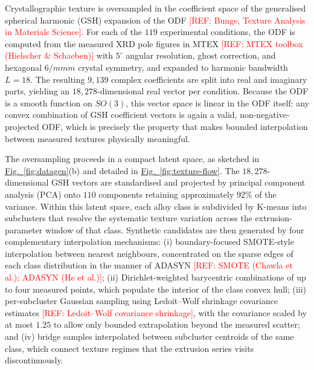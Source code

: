 \documentclass[preprint,12pt]{elsarticle}
\newcommand{\figref}[1]{\hyperref[#1]{Fig.~\ref*{#1}}}
\newcommand{\refneeded}[1]{\textcolor{red}{[REF: #1]}} %
\begin{document}
Crystallographic texture is oversampled in the coefficient space of the generalised spherical harmonic (GSH) expansion of the ODF \refneeded{Bunge, Texture Analysis in Materials Science}. For each of the $119$ experimental conditions, the ODF is computed from the measured XRD pole figures in MTEX \refneeded{MTEX toolbox (Hielscher \& Schaeben)} with $5^{\circ}$ angular resolution, ghost correction, and hexagonal $6/mmm$ crystal symmetry, and expanded to harmonic bandwidth $L = 18$. The resulting $9{,}139$ complex coefficients are split into real and imaginary parts, yielding an $18{,}278$-dimensional real vector per condition. Because the ODF is a smooth function on $SO(3)$, this vector space is linear in the ODF itself: any convex combination of GSH coefficient vectors is again a valid, non-negative-projected ODF, which is precisely the property that makes bounded interpolation between measured textures physically meaningful.

The oversampling proceeds in a compact latent space, as sketched in \figref{fig:datagen}(b) and detailed in \figref{fig:texture-flow}. The $18{,}278$-dimensional GSH vectors are standardised and projected by principal component analysis (PCA) onto $110$ components retaining approximately $92\%$ of the variance. Within this latent space, each alloy class is subdivided by K-means into subclusters that resolve the systematic texture variation across the extrusion-parameter window of that class. Synthetic candidates are then generated by four complementary interpolation mechanisms: (i) boundary-focused SMOTE-style interpolation between nearest neighbours, concentrated on the sparse edges of each class distribution in the manner of ADASYN \refneeded{SMOTE (Chawla et al.); ADASYN (He et al.)}; (ii) Dirichlet-weighted barycentric combinations of up to four measured points, which populate the interior of the class convex hull; (iii) per-subcluster Gaussian sampling using Ledoit--Wolf shrinkage covariance estimates \refneeded{Ledoit--Wolf covariance shrinkage}, with the covariance scaled by at most $1.25$ to allow only bounded extrapolation beyond the measured scatter; and (iv) bridge samples interpolated between subcluster centroids of the same class, which connect texture regimes that the extrusion series visits discontinuously.
\end{document}
